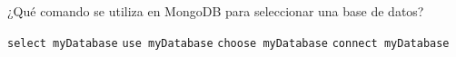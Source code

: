 \question[1] ¿Qué comando se utiliza en MongoDB para seleccionar una base de datos?
\begin{choices}
\choice \texttt{select myDatabase}
\CorrectChoice \texttt{use myDatabase}
\choice \texttt{choose myDatabase}
\choice \texttt{connect myDatabase}
\end{choices}